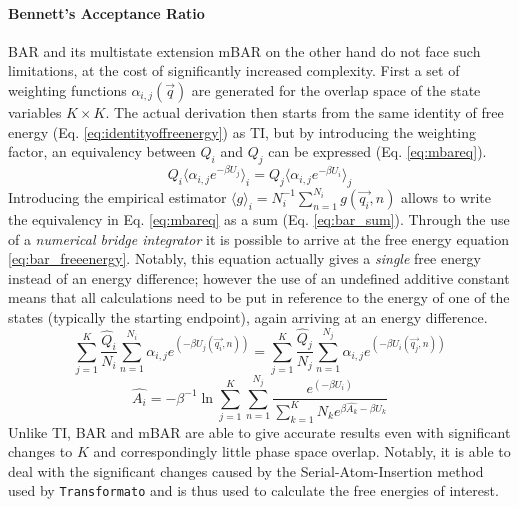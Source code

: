 \documentclass[oneside]{scrreprt}
\begin{document}
\paragraph{Bennett's Acceptance Ratio} BAR and its multistate extension mBAR on the other hand do not face such limitations, at the cost of significantly increased complexity. First a set of weighting functions $\alpha_{i,j} (\Vec{q})$ are generated for the overlap space of the state variables $K \times K$. The actual derivation then starts from the same identity of free energy (Eq. \ref{eq:identityoffreenergy}) as TI, but by introducing the weighting factor, an equivalency between $Q_i$ and $Q_j$ can be expressed (Eq. \ref{eq:mbareq}).
\begin{equation} \label{eq:mbareq}
    Q_i\langle \alpha_{i,j} e^{-\beta U_j}\rangle_i = Q_j \langle \alpha_{i,j} e^{-\beta U_i} \rangle_j
\end{equation}
Introducing the empirical estimator $\langle g \rangle_i = N_i^{-1} \sum_{n=1}^{N_i} g(\Vec{q_i},n)$ allows to write the equivalency in Eq. \ref{eq:mbareq} as a sum (Eq. \ref{eq:bar_sum}). Through the use of a \emph{numerical bridge integrator} \cite{tan_likelihood_2004} it is possible to arrive at the free energy equation \ref{eq:bar_freeenergy}. Notably, this equation actually gives a \emph{single} free energy instead of an energy difference; however the use of an undefined additive constant means that all calculations need to be put in reference to the energy of one of the states (typically the starting endpoint), again arriving at an energy difference.
\begin{equation} \label{eq:bar_sum}
    \sum^K_{j=1}\frac{\hat{Q}_i}{N_i} \sum_{n=1}^{N_i} \alpha_{i,j} e^{(-\beta U_j(\Vec{q_i},n))} = \sum^K_{j=1}\frac{\hat{Q}_j}{N_j} \sum_{n=1}^{N_j} \alpha_{i,j} e^{(-\beta U_i(\Vec{q_j},n))}
\end{equation}
\begin{equation} \label{eq:bar_freeenergy}
\hat{A_i}= -\beta^{-1} \ln{\sum^K_{j=1} \sum^{N_j}_{n=1}\frac{e^{(-\beta U_i)}}{\sum^K_{k=1} N_k e^{\beta \hat{A_k}-\beta U_k}}}   
\end{equation}
Unlike TI, BAR and mBAR are able to give accurate results even with significant changes to $K$ and correspondingly little phase space overlap. Notably, it is able to deal with the significant changes caused by the Serial-Atom-Insertion method used by \texttt{Transformato} and is thus used to calculate the free energies of interest.
\end{document}
